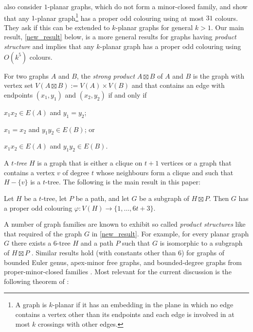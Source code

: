 \documentclass{patmorin}
\begin{document}
\citet{cranston.lafferty.ea:note} also consider $1$-planar graphs, which do not form a minor-closed family, and show that any $1$-planar graph\footnote{A graph is $k$-planar if it has an embedding in the plane in which no edge contains a vertex other than its endpoints and each edge is involved in at most $k$ crossings with other edges.} has a proper odd colouring using at most $31$ colours.  They ask if this can be extended to $k$-planar graphs for general $k>1$.  Our main result, \cref{new_result} below, is a more general results for graphs having \emph{product structure} and implies that any $k$-planar graph has a proper odd colouring using $O(k^5)$ colours.
%

For two graphs $A$ and $B$, the \emph{strong product} $A\boxtimes B$ of $A$ and $B$ is the graph with vertex set $V(A\boxtimes B):=V(A)\times V(B)$ and that contains an edge with endpoints $(x_1,y_1)$ and $(x_2,y_2)$ if and only if
\begin{inparaenum}[(i)]
  \item $x_1x_2\in E(A)$ and $y_1=y_2$;
  \item $x_1=x_2$ and $y_1y_2\in E(B)$; or
  \item $x_1x_2\in E(A)$ and $y_1y_2\in E(B)$.
\end{inparaenum}
A \emph{$t$-tree} $H$ is a graph that is either a clique on $t+1$ vertices or a graph that contains a vertex $v$ of degree $t$ whose neighbours form a clique and such that $H-\{v\}$ is a $t$-tree.  The following is the main result in this paper:
  
\begin{thm}\label{new_result}
  Let $H$ be a $t$-tree, let $P$ be a path, and let $G$ be a subgraph of $H\boxtimes P$. Then $G$ has a proper odd colouring $\varphi:V(H)\to\{1,\ldots,6t+3\}$.
\end{thm}

A number of graph families are known to exhibit so called \emph{product structures} like that required of the graph $G$ in \cref{new_result}.  For example, for every planar graph $G$ there exists a $6$-tree $H$ and a path $P$ such that $G$ is isomorphic to a subgraph of $H\boxtimes P$ \cite{ueckerdt.wood.ea:improved}.  Similar results hold (with constants other than $6$) for graphs of bounded Euler genus, apex-minor free graphs, and bounded-degree graphs from proper-minor-closed families \cite{dujmovic.joret.ea:planar,dujmovic.esperet.ea:clustered}.  Most relevant for the current discussion is the following theorem of \citet{dujmovic.morin.ea:structure}:
\end{document}
